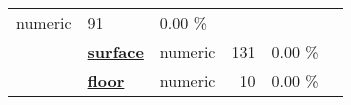 \documentclass[]{article}
\begin{document}
\begin{longtable}[]{@{}lllrcl@{}}
\begin{minipage}[t]{0.11\columnwidth}
numeric\strut
\end{minipage} & \begin{minipage}[t]{0.12\columnwidth}\raggedleft\strut
91\strut
\end{minipage} & \begin{minipage}[t]{0.11\columnwidth}\centering\strut
0.00 \%\strut
\end{minipage} & \begin{minipage}[t]{0.14\columnwidth}\raggedright\strut
\strut
\end{minipage}\tabularnewline
\begin{minipage}[t]{0.09\columnwidth}\raggedright\strut
\strut
\end{minipage} & \begin{minipage}[t]{0.28\columnwidth}\raggedright\strut
\textbf{\protect\hyperlink{surface}{surface}}\strut
\end{minipage} & \begin{minipage}[t]{0.11\columnwidth}\raggedright\strut
numeric\strut
\end{minipage} & \begin{minipage}[t]{0.12\columnwidth}\raggedleft\strut
131\strut
\end{minipage} & \begin{minipage}[t]{0.11\columnwidth}\centering\strut
0.00 \%\strut
\end{minipage} & \begin{minipage}[t]{0.14\columnwidth}\raggedright\strut
\strut
\end{minipage}\tabularnewline
\begin{minipage}[t]{0.09\columnwidth}\raggedright\strut
\strut
\end{minipage} & \begin{minipage}[t]{0.28\columnwidth}\raggedright\strut
\textbf{\protect\hyperlink{floor}{floor}}\strut
\end{minipage} & \begin{minipage}[t]{0.11\columnwidth}\raggedright\strut
numeric\strut
\end{minipage} & \begin{minipage}[t]{0.12\columnwidth}\raggedleft\strut
10\strut
\end{minipage} & \begin{minipage}[t]{0.11\columnwidth}\centering\strut
0.00 \%\strut
\end{minipage} & \begin{minipage}[t]{0.14\columnwidth}\raggedright\strut
\strut
\end{minipage}\tabularnewline

\end{longtable}
\end{document}

